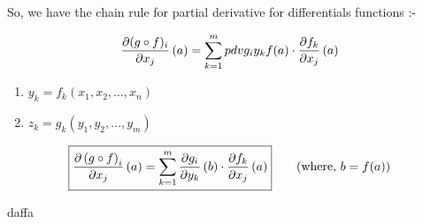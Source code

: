 \documentclass[Analysis-3]{subfiles}
\begin{document}
So, we have the chain rule for partial derivative for differentials functions :-

\[ \pdv{(g\circ f)_{i}}{x_j}\left( a \right) = \sum_{k = 1}^{m}   pdv{g_i}{y_k}f(a)\cdot\pdv{f_k}{x_j}\left( a \right) \]


\begin{notnBox}
    \begin{enumerate}
        \item $y_k = f_k \left( x_1, x_2, \ldots, x_n \right)$
        \item $z_k = g_k \left( y_1, y_2, \ldots, y_m \right)$
    \end{enumerate}
\end{notnBox}

\begin{align*}
    \boxed{
        \pdv{\left( g\circ f \right)_i}{x_j}\left( a \right) = \sum_{k = 1}^{m} \pdv{g_i}{y_k}\left( b \right)\cdot\pdv{f_k}{x_j}\left( a \right)
    } \tag{where, $b = f(a)$}
\end{align*}

daffa
\end{document}

